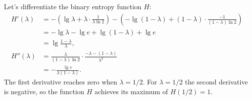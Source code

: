 Let's differentiate the binary entropy function $H$:
\begin{align*}
    H'(\lambda) &= -\left(\lg\lambda+\lambda\cdot\frac{1}{\lambda\ln2}\right)-\left(-\lg(1-\lambda)+(1-\lambda)\cdot\frac{-1}{(1-\lambda)\ln2}\right) \\[1mm]
    &= -\lg\lambda-\lg e+\lg(1-\lambda)+\lg e \\[1mm]
    &= \lg\frac{1-\lambda}{\lambda}, \\[1mm]
    H''(\lambda) &= \frac{\lambda}{(1-\lambda)\ln2}\cdot\frac{-\lambda-(1-\lambda)}{\lambda^2} \\[1mm]
    &= -\frac{\lg e}{\lambda(1-\lambda)}.
\end{align*}
The first derivative reaches zero when $\lambda=1/2$.
For $\lambda=1/2$ the second derivative is negative, so the function $H$ achieves its maximum of $H(1/2)=1$.
